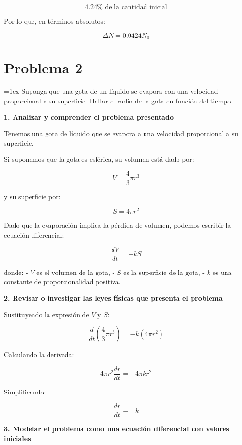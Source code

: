 \documentclass[answers]{exam}
\edef\svparindent{\the\parindent}
\newenvironment{specindent}
  {\par\everypar{\leftskip=\svparindent\relax}\parindent=0pt\relax\parskip=1ex}
  {\vspace{\parskip}\par}
\begin{document}
\[
	4.24\% \text{ de la cantidad inicial}
\]

Por lo que, en términos absolutos:

\[
	\Delta N = 0.0424 N_0
\]


\section*{Problema 2}

\begin{specindent}
	Suponga que una gota de un líquido se evapora con una velocidad proporcional a su superficie. Hallar el radio de la gota en función del tiempo.
\end{specindent}

\vspace{0.5em}

\textbf{1. Analizar y comprender el problema presentado}

Tenemos una gota de líquido que se evapora a una velocidad proporcional a su superficie.

Si suponemos que la gota es esférica, su volumen está dado por:

\[
	V = \frac{4}{3} \pi r^3
\]

y su superficie por:

\[
	S = 4 \pi r^2
\]

Dado que la evaporación implica la pérdida de volumen, podemos escribir la ecuación diferencial:

\[
	\frac{dV}{dt} = - k S
\]

donde:
- \( V \) es el volumen de la gota,
- \( S \) es la superficie de la gota,
- \( k \) es una constante de proporcionalidad positiva.

\vspace{0.3cm}
\textbf{2. Revisar o investigar las leyes físicas que presenta el problema}

Sustituyendo la expresión de \( V \) y \( S \):

\[
	\frac{d}{dt} \left( \frac{4}{3} \pi r^3 \right) = - k (4 \pi r^2)
\]

Calculando la derivada:

\[
	4 \pi r^2 \frac{dr}{dt} = - 4 \pi k r^2
\]

Simplificando:

\[
	\frac{dr}{dt} = - k
\]

\vspace{0.3cm}
\textbf{3. Modelar el problema como una ecuación diferencial con valores iniciales}
\end{document}

